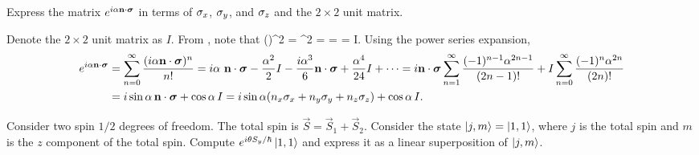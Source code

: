 \begin{problem} \label{2.2}
	Express the matrix $e^{i \alpha \mathbf{n} \cdot \boldsymbol{\sigma}}$ in terms of $\sigma_x$, $\sigma_y$, and $\sigma_z$ and the $2 \times 2$ unit matrix.
\end{problem}

\begin{solution}
	Denote the $2 \times 2$ unit matrix as $I$.  From , note that
	\beqn \label{paulisq}
		(\nds)^2 = \mqty[ \nz & \nx - i \ny \\ \nx + i \ny & -\nz ]^2
		= \mqty[ \nx^2 + \ny^2 + \nz^2 & (\nz - \nz) (\nx - i \ny) \\
				(\nz - \nz) (\nx + i \ny) & \nx^2 + \ny^2 + \nz^2]
		= \mqty[ 1 & 0 \\ 0 & 1 ]
		= I.
	\eeqn
	Using the power series expansion,
	\begin{align*}
		e^{i \alpha \mathbf{n} \cdot \boldsymbol{\sigma}} &= \sum_{n = 0}^\infty \frac{(i \alpha \mathbf{n} \cdot \boldsymbol{\sigma})^n}{n!}
		= i \alpha \ \mathbf{n} \cdot \boldsymbol{\sigma} - \frac{\alpha^2}{2} I - \frac{i \alpha^3}{6} \mathbf{n} \cdot \boldsymbol{\sigma} + \frac{\alpha^4}{24} I + \cdots
		= i \mathbf{n} \cdot \boldsymbol{\sigma} \sum_{n = 1}^\infty \frac{(-1)^{n-1} \alpha^{2n - 1}}{(2n - 1)!} + I \sum_{n = 0}^\infty \frac{(-1)^n \alpha^{2n}}{(2n)!} \\
		&= i \sin{\alpha} \, \mathbf{n} \cdot \boldsymbol{\sigma} + \cos{\alpha} \, I = i \sin{\alpha} (n_x \sigma_x + n_y \sigma_y + n_z \sigma_z) + \cos{\alpha} \, I.
	\end{align*}
\vfix
\end{solution}

\newcommand{\Sy}{S_y}
\newcommand{\Sz}{S_z}
\newcommand{\vS}{\vec{S}}
\newcommand{\vSq}{\vS_1}
\newcommand{\vSw}{\vS_2}
\newcommand{\eitsyh}{e^{i \tht \Sy / \hbar}}

\newcommand{\kjm}{\ket{j, m}}
\newcommand{\kqq}{\ket{1, 1}}
\newcommand{\koo}{\ket{0, 0}}
\newcommand{\kqo}{\ket{1, 0}}
\newcommand{\kqnq}{\ket{1, -1}}

\newcommand{\Syq}{{\Sy}_1}
\newcommand{\Syw}{{\Sy}_2}
\newcommand{\sz}{s_z}
\newcommand{\ksz}{\ket{\sz}}
\newcommand{\szq}{{\sz}_1}
\newcommand{\szw}{{\sz}_2}
\newcommand{\kszsz}{\ket{\szq \, \szw}}

\newcommand{\up}{\uparrow}
\newcommand{\dn}{\downarrow}
\newcommand{\kuu}{\ket{\up \up}}
\newcommand{\kdd}{\ket{\dn \dn}}
\newcommand{\kud}{\ket{\up \dn}}
\newcommand{\kdu}{\ket{\dn \up}}

\begin{problem}
	Consider two spin $1/2$ degrees of freedom.  The total spin is $\vS = \vSq + \vSw$.  Consider the state $\kjm = \kqq$, where $j$ is the total spin and $m$ is the $z$ component of the total spin.  Compute $\eitsyh \kqq$ and express it as a linear superposition of $\kjm$.
\end{problem}

